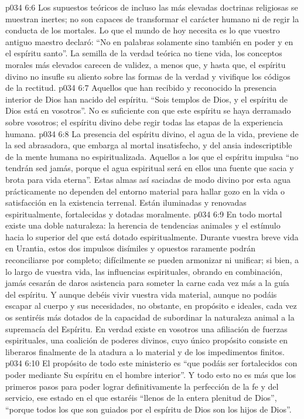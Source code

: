 \vs p034 6:6 Los supuestos teóricos de incluso las más elevadas doctrinas religiosas se muestran inertes; no son capaces de transformar el carácter humano ni de regir la conducta de los mortales. Lo que el mundo de hoy necesita es lo que vuestro antiguo maestro declaró: “No en palabras solamente sino también en poder y en el espíritu santo”. La semilla de la verdad teórica no tiene vida, los conceptos morales más elevados carecen de validez, a menos que, y hasta que, el espíritu divino no insufle su aliento sobre las formas de la verdad y vivifique los códigos de la rectitud.
\vs p034 6:7 Aquellos que han recibido y reconocido la presencia interior de Dios han nacido del espíritu. “Sois templos de Dios, y el espíritu de Dios está en vosotros”. No es suficiente con que este espíritu se haya derramado sobre vosotros; el espíritu divino debe regir todas las etapas de la experiencia humana.
\vs p034 6:8 La presencia del espíritu divino, el agua de la vida, previene de la sed abrasadora, que embarga al mortal insatisfecho, y del ansia indescriptible de la mente humana no espiritualizada. Aquellos a los que el espíritu impulsa “no tendrán sed jamás, porque el agua espiritual será en ellos una fuente que sacia y brota para vida eterna”. Estas almas así saciadas de modo divino por esta agua prácticamente no dependen del entorno material para hallar gozo en la vida o satisfacción en la existencia terrenal. Están iluminadas y renovadas espiritualmente, fortalecidas y dotadas moralmente.
\vs p034 6:9 \pc En todo mortal existe una doble naturaleza: la herencia de tendencias animales y el estímulo hacia lo superior del que está dotado espiritualmente. Durante vuestra breve vida en Urantia, estos dos impulsos disímiles y opuestos raramente podrán reconciliarse por completo; difícilmente se pueden armonizar ni unificar; si bien, a lo largo de vuestra vida, las influencias espirituales, obrando en combinación, jamás cesarán de daros asistencia para someter la carne cada vez más a la guía del espíritu. Y aunque debéis vivir vuestra vida material, aunque no podáis escapar al cuerpo y sus necesidades, no obstante, en propósito e ideales, cada vez os sentiréis más dotados de la capacidad de subordinar la naturaleza animal a la supremacía del Espíritu. En verdad existe en vosotros una afiliación de fuerzas espirituales, una coalición de poderes divinos, cuyo único propósito consiste en liberaros finalmente de la atadura a lo material y de los impedimentos finitos.
\vs p034 6:10 El propósito de todo este ministerio es “que podáis ser fortalecidos con poder mediante Su espíritu en el hombre interior”. Y todo esto no es más que los primeros pasos para poder lograr definitivamente la perfección de la fe y del servicio, ese estado en el que estaréis “llenos de la entera plenitud de Dios”, “porque todos los que son guiados por el espíritu de Dios son los hijos de Dios”.
